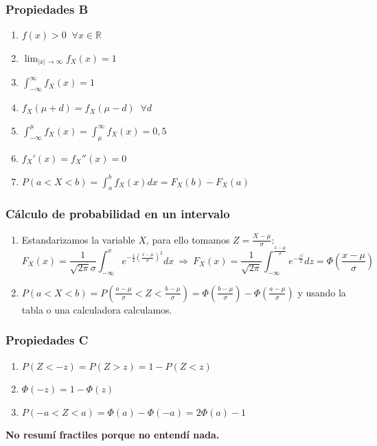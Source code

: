 \documentclass{article}
\newcommand{\reales}{\mathbb{R}}                        %
\newcommand{\Rightarrows}{\: \Rightarrow \:}            %
\begin{document}
\subsubsection*{Propiedades B}
\begin{enumerate}
    \item $f(x) > 0 \;\; \forall x \in \reales$
    \item $\lim_{|x| \rightarrow \infty} f_X(x) = 1$
    \item $\int^\infty_{-\infty} f_X(x) = 1$
    \item $f_X(\mu + d) = f_X(\mu - d) \;\; \forall d$
    \item $\int^\mu_{-\infty} f_X(x) = \int^\infty_{\mu} f_X(x) = 0,5$
    \item $f_X'(x) = f_X''(x) = 0$
    \item $P(a < X < b) = \int_a^b f_X(x) dx = F_X(b) - F_X(a)$
\end{enumerate}

\subsubsection*{Cálculo de probabilidad en un intervalo}
\begin{enumerate}
    \item Estandarizamos la variable $X$, para ello tomamos $Z = \frac{X - \mu}{\sigma}$:
    \begin{equation*}
        F_X(x) = \frac{1}{\sqrt{2 \pi} \sigma} \int^x_{-\infty} e^{-\frac{1}{2}(\frac{x - \mu}{\sigma})^2} dx \Rightarrows F_X(x) = \frac{1}{\sqrt{2 \pi}} \int^{\frac{x- \mu}{\sigma}}_{-\infty} e^{-\frac{z^2}{2}} dz = \Phi\left(\frac{x - \mu}{\sigma}\right)
    \end{equation*}
    \item $P(a < X < b) = P(\frac{a - \mu}{\sigma} < Z < \frac{b - \mu}{\sigma}) = \Phi(\frac{b - \mu}{\sigma}) - \Phi(\frac{a - \mu}{\sigma})$ y usando la tabla o una calculadora calculamos.
\end{enumerate}

\subsubsection*{Propiedades C}
\begin{enumerate}
    \item $P(Z < -z) = P(Z > z) = 1 - P(Z < z)$
    \item $\Phi(-z) = 1 - \Phi(z)$
    \item $P(-a < Z < a) = \Phi(a) - \Phi(-a) = 2\Phi(a) - 1$
\end{enumerate}
\textbf{No resumí fractiles porque no entendí nada.}
\end{document}
